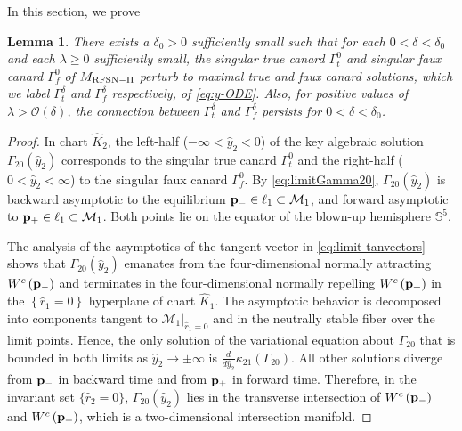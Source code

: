 \documentclass[11pt]{article}
\numberwithin{equation}{section}
\newtheorem{lemma}{Lemma}[section]
\begin{document}
In this section, we prove

\begin{lemma}\label{lem-persistenttrue+fauxcanards-RFSNII}
There exists a $\delta_0>0$ sufficiently small such that for each $0< \delta<\delta_0$ and each $\lambda\ge 0$ sufficiently small,
the singular true canard $\Gamma_{t}^0$ and singular faux canard $\Gamma_{f}^0$ of $M_{\rm RFSN-II}$ perturb to maximal true and faux canard solutions,  which we label $\Gamma_{t}^{\delta}$ and $\Gamma_{f}^{\delta}$ respectively, of \eqref{eq:y-ODE}.
Also, for positive values of $\lambda > \mathcal{O}(\delta)$, the connection between $\Gamma_t^\delta$ and $\Gamma_f^\delta$ persists for $0<\delta<\delta_0$.
\end{lemma}

\begin{proof} 
In chart $\hat{K}_2$, the left-half ($-\infty < \hat{y}_2<0$) of the key algebraic solution $\Gamma_{20}(\hat{y}_2)$ corresponds to the singular true canard $\Gamma_{t}^0$ and the right-half ($0< \hat{y}_2 < \infty$) to the singular faux canard $\Gamma_{f}^0$.
By \eqref{eq:limitGamma20},
$\Gamma_{20}(\hat{y}_2)$ is backward asymptotic to the equilibrium ${\bf p}_{-} \in \ell_1 \subset \mathcal{M}_1$, and forward asymptotic to ${\bf p}_{+} \in \ell_1 \subset \mathcal{M}_1$.
Both points lie on the equator of the blown-up hemisphere $\mathbb{S}^5$.

The analysis of the asymptotics of the tangent vector in \eqref{eq:limit-tanvectors} shows that $\Gamma_{20}(\hat{y}_2)$ emanates from the four-dimensional normally attracting $W^{c}\left( \bf{p}_- \right)$ and terminates in the four-dimensional normally repelling $W^{c}\left( \bf{p}_+ \right)$ in the $\left\{ \hat{r}_1=0 \right\}$ hyperplane of chart $\hat{K}_1$.
The asymptotic behavior is decomposed into components tangent to 
$\mathcal{M}_{1}\rvert_{\hat{r}_{1}=0}$ and in the neutrally stable fiber over the limit points.
Hence, the only solution of the variational equation about $\Gamma_{20}$ that is bounded in both limits as $\hat{y}_2 \to \pm \infty$ is $\tfrac{d}{d\hat{y}_2}\kappa_{21}(\Gamma_{20})$.
All other solutions diverge from ${\bf p}_-$ in backward time and from ${\bf p}_+$ in forward time. 
Therefore, in the invariant set $\{ \hat r_2=0 \}$, $\Gamma_{20}(\hat{y}_2)$ lies in the transverse intersection of $W^{c}\left( \bf{p}_- \right)$ and $W^{c}\left( \bf{p}_+ \right)$, which is a two-dimensional intersection manifold.


\end{proof}
\end{document}
